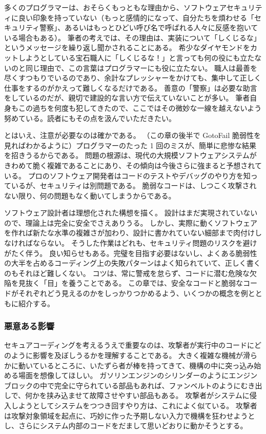 \documentclass[uplatex]{jsarticle}
\begin{document}
多くのプログラマーは、おそらくもっともな理由から、ソフトウェアセキュリティに良い印象を持っていない（もっと感情的になって、自分たちを煩わせる「セキュリティ警察」、あるいはもっとひどい呼び名で呼ばれる人々に反感を抱いている場合もある）。
筆者の考えでは、その理由は、実装について「しくじるな」というメッセージを繰り返し聞かされることにある。
希少なダイヤモンドをカットしようとしている宝石職人に「しくじるな！」と言っても何の役にも立たないのと同じ理由で、この言葉はプログラマーにも役に立たない。
職人は最善を尽くすつもりでいるのであり、余計なプレッシャーをかけても、集中して正しく仕事をするのがかえって難しくなるだけである。
善意の「警察」は必要な助言をしているのだが、親切で建設的な言い方で伝えていないことが多い。
筆者自身もこの過ちを何度も犯してきたので、ここではその微妙な一線を越えないよう努めている。読者にもその点を汲んでいただきたい。

とはいえ、注意が必要なのは確かである。
（この章の後半で GotoFail 脆弱性を見ればわかるように）プログラマーのたった 1 回のミスが、簡単に悲惨な結果を招きうるからである。
問題の根源は、現代の大規模ソフトウェアシステムがきわめて脆く複雑であることにあり、その傾向は今後さらに強まると予想されている。
プロのソフトウェア開発者はコードのテストやデバッグのやり方を知っているが、セキュリティは別問題である。
脆弱なコードは、しつこく攻撃されない限り、何の問題もなく動いてしまうからである。

ソフトウェア設計者は理想化された構想を描く。
設計はまだ実現されていないので、理論上は完全に安全でさえありうる。
しかし、実際に動くソフトウェアを作れば新たな水準の複雑さが加わり、設計に書かれていない細部まで肉付けしなければならない。
そうした作業はどれも、セキュリティ問題のリスクを避けがたく伴う。
良い知らせもある。完璧を目指す必要はないし、よくある脆弱性の大半を占めるコーディング上の失敗パターンはよく知られていて、正しく書くのもそれほど難しくない。
コツは、常に警戒を怠らず、コードに潜む危険な欠陥を見抜く「目」を養うことである。
この章では、安全なコードと脆弱なコードがそれぞれどう見えるのかをしっかりつかめるよう、いくつかの概念を例とともに紹介する。

\subsubsection{悪意ある影響}

セキュアコーディングを考えるうえで重要なのは、攻撃者が実行中のコードにどのように影響を及ぼしうるかを理解することである。
大きく複雑な機械が滑らかに動いているところに、いたずら者が棒を持ってきて、機構の中に突っ込み始める場面を想像してほしい。
ガソリンエンジンのシリンダーのようにエンジンブロックの中で完全に守られている部品もあれば、ファンベルトのようにむき出しで、何かを挟み込ませて故障させやすい部品もある。
攻撃者がシステムに侵入しようとしてシステムをつつき回すやり方は、これによく似ている。
攻撃者は攻撃対象領域を起点に、巧妙に作った予期しない入力で機構を狂わせようとし、さらにシステム内部のコードをだまして思いどおりに動かそうとする。
\end{document}
